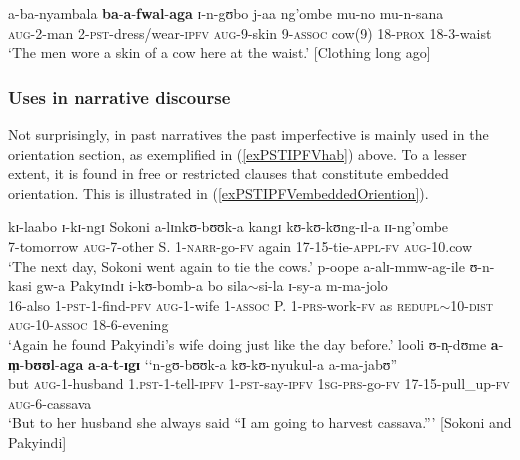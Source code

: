 \begin{exe}
\ex
\gll a-ba-nyambala \textbf{ba}-\textbf{a}-\textbf{fwal}-\textbf{aga} ɪ-n-gʊbo j-aa ng'ombe mu-no mu-n-sana\\
\textsc{aug}-2-man 2-\textsc{pst}-dress/wear-\textsc{ipfv} \textsc{aug}-9-skin 9-\textsc{assoc} cow(9) 18-\textsc{prox} 18-3-waist\\
\glt \lq The men wore a skin of a cow here at the waist.' [Clothing long ago]\label{exPSTIPFVgen}
\end{exe}

\subsubsection{Uses in narrative discourse}
Not surprisingly, in past narratives the past imperfective is mainly used in the orientation section, as exemplified in (\ref{exPSTIPFVhab}) above. To a lesser extent, it is found in free or restricted clauses that constitute embedded orientation. This is illustrated in (\ref{exPSTIPFVembeddedOriention}). %

\begin{exe}
\ex \label{exPSTIPFVembeddedOriention} 
\gll kɪ-laabo ɪ-kɪ-ngɪ Sokoni a-lɪnkʊ-bʊʊk-a kangɪ kʊ-kʊ-kʊng-ɪl-a ɪɪ-ng'ombe\\
7-tomorrow \textsc{aug}-7-other S. 1-\textsc{narr}-go-\textsc{fv} again 17-15-tie-\textsc{appl}-\textsc{fv} \textsc{aug}-10.cow\\
\glt `The next day, Sokoni went again to tie the cows.'
\sn \gll p-oope a-alɪ-mmw-ag-ile ʊ-n-kasi gw-a Pakyɪndɪ i-kʊ-bomb-a bo sila$\sim$si-la ɪ-sy-a m-ma-jolo\\
16-also 1-\textsc{pst}-1-find-\textsc{pfv} \textsc{aug}-1-wife 1-\textsc{assoc} P. 1-\textsc{prs}-work-\textsc{fv} as \textsc{redupl}$\sim$10-\textsc{dist} \textsc{aug}-10-\textsc{assoc} 18-6-evening\\
\glt `Again he found Pakyindi's wife doing just like the day before.'
\sn\gll looli ʊ-n̩-dʊme \textbf{a}-\textbf{m̩}-\textbf{bʊʊl}-\textbf{aga} \textbf{a}-\textbf{a}-\textbf{t}-\textbf{ɪgɪ} \textup{\lq\lq}n-gʊ-bʊʊk-a kʊ-kʊ-nyukul-a a-ma-jabʊ\textup{''}\\
but \textsc{aug}-1-husband 1.\textsc{pst}-1-tell-\textsc{ipfv} 1-\textsc{pst}-say-\textsc{ipfv} \phantom{\lq\lq}\textsc{1sg}-\textsc{prs}-go-\textsc{fv} 17-15-pull\_up-\textsc{fv} \textsc{aug}-6-cassava\\
\glt `But to her husband she always said ``I am going to harvest cassava.''{}' [Sokoni and Pakyindi]
\end{exe}

